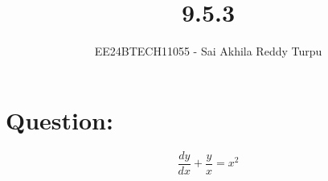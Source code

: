 \documentclass[journal]{IEEEtran}
\begin{document}

\vspace{3cm}

\title{9.5.3}
\author{EE24BTECH11055 - Sai Akhila Reddy Turpu}
{\let\newpage\relax\maketitle}

\renewcommand{\thefigure}{\theenumi}
\renewcommand{\thetable}{\theenumi}
\setlength{\intextsep}{10pt} %


\renewcommand{\thetable}{\theenumi}

\section*{Question:}
\begin{equation}
\frac{dy}{dx} + \frac{y}{x} = x^2
\end{equation}
\end{document}

